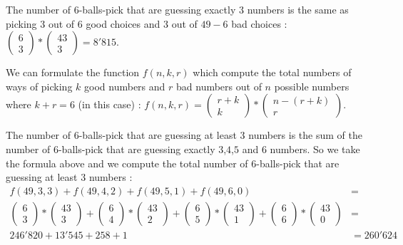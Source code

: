 \documentclass[a4paper,11pt]{report}
\begin{document}
The number of 6-balls-pick that are guessing exactly $3$ numbers is the same as
picking $3$ out of $6$ good choices and $3$ out of $49-6$ bad choices :
$\begin{pmatrix} 6 \\ 3\end{pmatrix} * \begin{pmatrix} 43 \\ 3\end{pmatrix} =
8'815$.

We can formulate the function $f(n,k,r)$ which compute the total numbers of ways
of picking $k$ good numbers and $r$ bad numbers out of $n$ possible numbers
where $k + r = 6$ (in this case) : $f(n,k,r) = \begin{pmatrix} r + k \\
  k \end{pmatrix} * \begin{pmatrix} n-(r+k) \\ r\end{pmatrix}$.

The number of 6-balls-pick that are guessing at least $3$ numbers is the sum of
the number of 6-balls-pick that are guessing exactly $3$,$4$,$5$ and $6$ numbers. So
we take the formula above and we compute the total number of 6-balls-pick that
are guessing at least $3$ numbers :
\begin{align*}
  f(49,3,3) + f(49,4,2) + f(49,5,1) + f(49,6,0) &=\\
  \begin{pmatrix} 6 \\ 3\end{pmatrix} * \begin{pmatrix} 43 \\ 3\end{pmatrix} +
  \begin{pmatrix} 6 \\ 4\end{pmatrix} * \begin{pmatrix} 43 \\ 2\end{pmatrix} +
  \begin{pmatrix} 6 \\ 5\end{pmatrix} * \begin{pmatrix} 43 \\ 1\end{pmatrix} +
  \begin{pmatrix} 6 \\ 6\end{pmatrix} * \begin{pmatrix} 43 \\ 0\end{pmatrix} &=\\
  246'820 + 13'545 + 258 + 1 &= 260'624
\end{align*}
\end{document}
